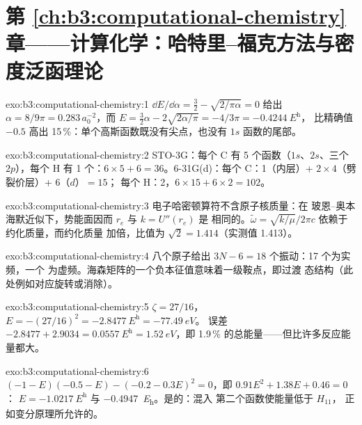 \section*{第 \ref{ch:b3:computational-chemistry} 章——计算化学：哈特里–福克方法与密度泛函理论}

\begin{solution}{exo:b3:computational-chemistry:1}
$\dd E/\dd\alpha = \frac32 - \sqrt{2/\pi\alpha} = 0$ 给出 $\alpha = 8/9\pi = 0.283\,
a_0^{-2}$，而 $E = \frac32\alpha - 2\sqrt{2\alpha/\pi} = -4/3\pi = \qty{-0.4244}{\hartree}$，
比精确值 $-0.5$ 高出 15\,\%：单个高斯函数既没有尖点，也没有
$1s$ 函数的尾部。
\end{solution}

\begin{solution}{exo:b3:computational-chemistry:2}
STO-3G：每个 C 有 5 个函数（$1s$、$2s$、三个 $2p$），每个 H 有 1 个：$6 \times 5 + 6 =
36$。6-31G(d)：每个 C：1（内层）+ $2 \times 4$（劈裂价层）+ 6（$d$）$= 15$；
每个 H：2，$6 \times 15 + 6 \times 2 = 102$。
\end{solution}

\begin{solution}{exo:b3:computational-chemistry:3}
电子哈密顿算符不含原子核质量：在
玻恩–奥本海默近似下，势能面因而 $r_e$ 与 $k = U''(r_e)$ 是
相同的。$\tilde\omega = \sqrt{k/\mu}/2\pi c$ 依赖于约化质量，而约化质量
加倍，比值为 $\sqrt2 = 1.414$（实测值 1.413）。
\end{solution}

\begin{solution}{exo:b3:computational-chemistry:4}
八个原子给出 $3N - 6 = 18$ 个振动：17 个为实频，一个
为虚频。海森矩阵的一个负本征值意味着一级鞍点，即过渡
态结构（此处例如对应旋转或消除）。
\end{solution}

\begin{solution}{exo:b3:computational-chemistry:5}
$\zeta = 27/16$，$E = -(27/16)^2 = \qty{-2.8477}{\hartree} = \qty{-77.49}{eV}$。
误差 $-2.8477 + 2.9034 = \qty{0.0557}{\hartree} = \qty{1.52}{eV}$，即
1.9\,\% 的总能量——但比许多反应能量都大。
\end{solution}

\begin{solution}{exo:b3:computational-chemistry:6}
$(-1 - E)(-0.5 - E) - (-0.2 - 0.3E)^2 = 0$，即 $0.91E^2 + 1.38E + 0.46 = 0$：
$E = \qty{-1.0217}{\hartree}$ 与 \qty{-0.4947}{\hartree}。是的：混入
第二个函数使能量低于 $H_{11}$，
正如变分原理所允许的。
\end{solution}


